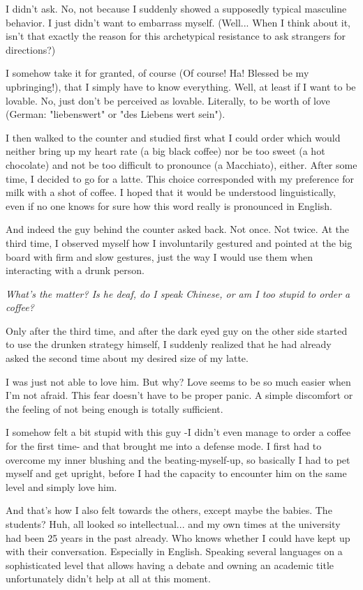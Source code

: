 I didn't ask. No, not because I suddenly showed a supposedly typical masculine behavior. I just didn't want to embarrass myself. (Well... When I think about it, isn't that exactly the reason for this archetypical resistance to ask strangers for directions?)

I somehow take it for granted, of course (Of course! Ha! Blessed be my upbringing!), that I simply have to know everything. Well, at least if I want to be lovable. No, just don't be perceived as lovable. Literally, to be worth of love (German: "liebenswert" or "des Liebens wert sein").

I then walked to the counter and studied first what I could order which would neither bring up my heart rate (a big black coffee) nor be too sweet (a hot chocolate) and not be too difficult to pronounce (a Macchiato), either. After some time, I decided to go for a latte. This choice corresponded with my preference for milk with a shot of coffee. I hoped that it would be understood linguistically, even if no one knows for sure how this word really is pronounced in English.

And indeed the guy behind the counter asked back. Not once. Not twice. At the third time, I observed myself how I involuntarily gestured and pointed at the big board with firm and slow gestures, just the way I would use them when interacting with a drunk person.

\textit{What's the matter? Is he deaf, do I speak Chinese, or am I too stupid to order a coffee?}

Only after the third time, and after the dark eyed guy on the other side started to use the drunken strategy himself, I suddenly realized that he had already asked the second time about my desired size of my latte.

I was just not able to love him. But why? Love seems to be so much easier when I'm not afraid. This fear doesn't have to be proper panic. A simple discomfort or the feeling of not being enough is totally sufficient.

I somehow felt a bit stupid with this guy -I didn't even manage to order a coffee for the first time- and that brought me into a defense mode. I first had to overcome my inner blushing and the beating-myself-up, so basically I had to pet myself and get upright, before I had the capacity to encounter him on the same level and simply love him.

And that's how I also felt towards the others, except maybe the babies. The students? Huh, all looked so intellectual... and my own times at the university had been 25 years in the past already. Who knows whether I could have kept up with their conversation. Especially in English. Speaking several languages on a sophisticated level that allows having a debate and owning an academic title unfortunately didn't help at all at this moment.

